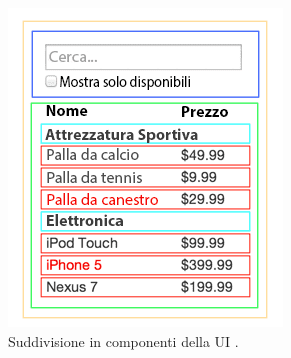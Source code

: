 \begin{figure}[H]
    \centering
    \includegraphics[width=0.40\linewidth]{img/thinking-in-react-components.png}
    \caption{Suddivisione in componenti della UI \cite{reactGetStart}.}
    \label{reactComp}
\end{figure}

